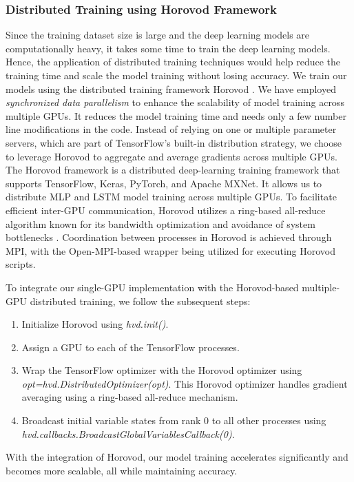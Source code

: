 \subsubsection{Distributed Training using Horovod Framework}
Since the training dataset size is large and the deep learning models are computationally heavy, it takes some time to train the deep learning models. Hence, the application of distributed training techniques would help reduce the training time and scale the model training without losing accuracy. We train our models using the distributed training framework Horovod \cite{sergeev2018horovod}. We have employed \textit{synchronized data parallelism} to enhance the scalability of model training across multiple GPUs. It reduces the model training time and needs only a few number line modifications in the code. 
Instead of relying on one or multiple parameter servers, which are part of TensorFlow's built-in distribution strategy, we choose to leverage Horovod to aggregate and average gradients across multiple GPUs. The Horovod framework is a distributed deep-learning training framework that supports TensorFlow, Keras, PyTorch, and Apache MXNet. It allows us to distribute MLP and LSTM model training across multiple GPUs. To facilitate efficient inter-GPU communication, Horovod utilizes a ring-based all-reduce algorithm known for its bandwidth optimization and avoidance of system bottlenecks \cite{patarasuk2009bandwidth}. Coordination between processes in Horovod is achieved through MPI, with the Open-MPI-based wrapper being utilized for executing Horovod scripts.


To integrate our single-GPU implementation with the Horovod-based multiple-GPU distributed training, we follow the subsequent steps:
\begin{enumerate}
    \item Initialize Horovod using \textit{hvd.init()}.
    \item Assign a GPU to each of the TensorFlow processes.
    \item Wrap the TensorFlow optimizer with the Horovod optimizer using \textit{opt=hvd.DistributedOptimizer(opt)}. This Horovod optimizer handles gradient averaging using a ring-based all-reduce mechanism.
    \item Broadcast initial variable states from rank 0 to all other processes using\\ \textit{hvd.callbacks.BroadcastGlobalVariablesCallback(0)}.
\end{enumerate}
With the integration of Horovod, our model training accelerates significantly and becomes more scalable, all while maintaining accuracy.


